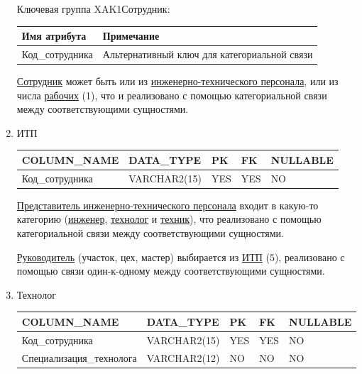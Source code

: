 \begin{enumerate}
\begin{tabular}{|p{7cm}|p{9.3cm}|}
    \end{tabular}

    Ключевая группа XAK1Сотрудник:

    \begin{tabular}{|p{7cm}|p{9.3cm}|} \hline

        {\bf Имя атрибута} & {\bf Примечание} \\ \hline
        Код\_сотрудника & Альтернативный ключ для категориальной связи \\ \hline

    \end{tabular}

    \underline{Сотрудник} может быть или из \underline{инженерно-технического персонала}, или из числа \underline{рабочих} (1), что и реализовано с помощью категориальной связи между соответствующими сущностями.

    \item{ИТП}

    \begin{tabular}{|p{7cm}|p{3cm}|p{1cm}|p{1cm}|p{3cm}|} \hline

        {\bf COLUMN\_NAME} & {\bf DATA\_TYPE} & {\bf PK} & {\bf FK} & {\bf NULLABLE} \\ \hline
        Код\_сотрудника & VARCHAR2(15) & YES & YES & NO \\ \hline

    \end{tabular}

    \underline{Представитель инженерно-технического персонала} входит в какую-то категорию (\underline{инженер}, \underline{технолог} и \underline{техник}), что реализовано с помощью категориальной связи между соответствующими сущностями.

    \underline{Руководитель} (участок, цех, мастер) выбирается из \underline{ИТП} (5), реализовано с помощью связи один-к-одному между соответствующими сущностями.

    \item{Технолог}

    \begin{tabular}{|p{7cm}|p{3cm}|p{1cm}|p{1cm}|p{3cm}|} \hline

        {\bf COLUMN\_NAME} & {\bf DATA\_TYPE} & {\bf PK} & {\bf FK} & {\bf NULLABLE} \\ \hline
        Код\_сотрудника & VARCHAR2(15) & YES & YES & NO \\ \hline
        Специализация\_технолога & VARCHAR2(12) & NO & NO & NO \\ \hline


\end{tabular}
\end{enumerate}
